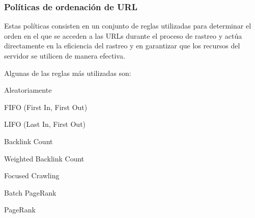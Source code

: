 \documentclass[
10pt, %
aspectratio=169, %
]{beamer}
\begin{document}
	\begin{frame}
		
		\frametitle{Políticas de ordenación de URL}
		
		Estas políticas consisten en un conjunto de reglas utilizadas para determinar el orden en el que se acceden a las URLs durante el proceso de rastreo y actúa directamente en la eficiencia del rastreo y en garantizar que los recursos del servidor se utilicen de manera efectiva.
		
		\vspace{2\baselineskip}
		
		Algunas de las reglas más utilizadas son:
		\begin{itemize}
			
			\begin{minipage}[t]{0.43\textwidth} %
				
				\item Aleatoriamente
				
				\item FIFO (First In, First Out)
				
				\item LIFO (Last In, First Out)
				
				\item Backlink Count
	
			\end{minipage}
			\hfill  %
			\begin{minipage}[t]{0.43\textwidth} %
				
				\item Weighted Backlink Count
				
				\item Focused Crawling
				
				\item Batch PageRank
				
				\item PageRank
				
			\end{minipage}
			
		\end{itemize}
				
	\end{frame}
		
\end{document}
